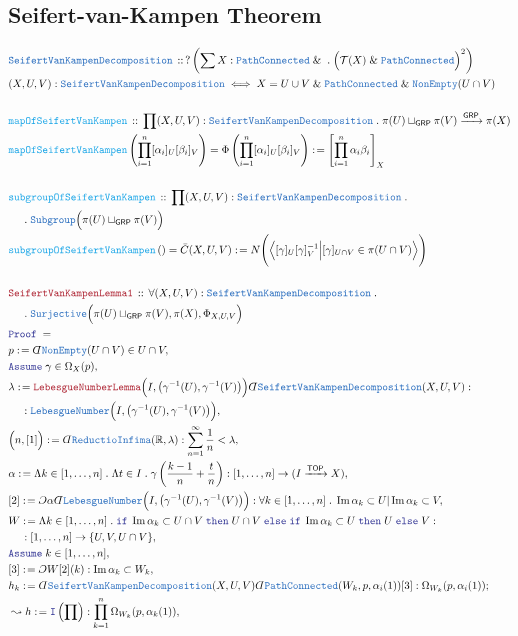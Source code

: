\documentclass[12pt]{scrartcl}
\newcommand{\TYPE}[1]{\textcolor{NavyBlue}{\mathtt{#1}}}
\newcommand{\FUNC}[1]{\textcolor{Cerulean}{\mathtt{#1}}}
\newcommand{\LOGIC}[1]{\textcolor{Blue}{\mathtt{#1}}}
\newcommand{\THM}[1]{\textcolor{Maroon}{\mathtt{#1}}}
\renewcommand{\.}{\; . \;}
\newcommand{\de}{: \kern 0.1pc =}
\newcommand{\If}{\LOGIC{if} \;}
\newcommand{\Then}{ \; \LOGIC{then} \;}
\newcommand{\Else}{\; \LOGIC{else} \;}
\newcommand{\Act}[1]{\left( #1 \right)}
\newcommand{\Theorem}[2]{& \THM{#1} \, :: \, #2 \\ & \Proof = \\ }
\newcommand{\DeclareType}[2]{& \TYPE{#1} \, :: \, #2 \\}
\newcommand{\DefineType}[3]{& #1 : \TYPE{#2} \iff #3 \\}
\newcommand{\DeclareFunc}[2]{& \FUNC{#1} \, :: \, #2 \\}
\newcommand{\DefineNamedFunc}[4]{&  \FUNC{#1}\Act{#2} = #3 \de #4 \\}
\newcommand{\NewLine}{\\ & \kern 1pc}
\newcommand{\Page}[1]{ \begin{align*} #1 \end{align*}   }
\newcommand{ \bd }{ \ByDef }
\renewcommand{\And}{\; \& \;}
\newcommand{\Intro}{\LOGIC{I}}
\newcommand{\Reals}{\mathbb{R} }
\DeclareMathOperator*{\im}{Im}
\newcommand{\Arrow}{\xrightarrow}
\newcommand{\Say}[3]{& #1 \de #2 : #3, \\}
\newcommand{\SayIn}[3]{& #1 \de #2 \in #3, \\}
\newcommand{\Conclude}[3]{& #1 \de #2 : #3; \\}
\newcommand{\Derive}[3]{& \leadsto #1 \de #2 : #3, \\}
\newcommand{\AssumeIn}[2]{& \LOGIC{Assume} \; #1 \in #2, \\}
\newcommand{\ByDef}{\rotatebox[origin=c]{-180}{$D$}}%
\newcommand{\ByConstr}{\rotatebox[origin=c]{-180}{$C$}}%
\newcommand{\Proof}{\LOGIC{Proof} \; }
\newcommand{\TOP}{\mathsf{TOP}}
\newcommand{\T}{\mathcal{T}}
\newcommand{\GRP}{\mathsf{GRP}}
\newcommand{\SVKD}{\TYPE{SeifertVanKampenDecomposition}}
\begin{document}
\subsection{Seifert-van-Kampen Theorem}
\Page{
	\DeclareType{\SVKD}
	{
		?\left(\sum X : \TYPE{PathConnected} \And  \. \Big(\T(X) \And \TYPE{PathConnected} \Big)^2 \right)
	}
	\DefineType{(X,U,V)}{\SVKD}{X = U \cup V \And \TYPE{PathConnected} \And \TYPE{NonEmpty}(U \cap V)}
	\\
	\DeclareFunc{mapOfSeifertVanKampen}
	{
		\prod (X,U,V) : \SVKD \.  \pi(U) \sqcup_{\GRP} \pi(V) \Arrow{\GRP} \pi(X) 
	}
	\DefineNamedFunc{mapOfSeifertVanKampen}{\prod^n_{i=1} [\alpha_i]_U [\beta_i]_V}
	{\Phi\left( \prod^n_{i=1} [\alpha_i]_U [\beta_i]_V \right)}
	{
		\left[ \prod^n_{i=1} \alpha_i \beta_i \right]_X
	}
	\\
	\DeclareFunc{subgroupOfSeifertVanKampen}
	{ 
		\prod (X,U,V) : \SVKD \. \NewLine \.\TYPE{Subgroup}\Big( \pi(U) \sqcup_\GRP \pi(V) \Big)
	}
	\DefineNamedFunc{subgroupOfSeifertVanKampen}{}
	{ \bar C(X,U,V)}
	{
		N\Bigg(\Big\langle  [\gamma]_U [\gamma]_V^{-1}  \Big|  [\gamma]_{U \cap V} \in \pi(U \cap V) \Big\rangle \Bigg)
	}
	\\
	\Theorem{SeifertVanKampenLemma1}{ 
		\forall (X,U,V) : \SVKD \. 
		\NewLine \.
		\TYPE{Surjective}\Big( \pi(U) \sqcup_{\GRP} \pi(V), \pi(X),\Phi_{X,U,V}\Big) 
	}
	\SayIn{p}{\bd \TYPE{NonEmpty}(U \cap V)}{U \cap V}
	\AssumeIn{\gamma}{\Omega_X(p)}
	\Say{\lambda}{\THM{LebesgueNumberLemma}\Big(I, \big(\gamma^{-1}(U),\gamma^{-1}(V) \big) \Big) \bd \SVKD(X,U,V)}
	{
		\NewLine :
		\TYPE{LebesgueNumber}\Big(I, \big(\gamma^{-1}(U),\gamma^{-1}(V) \big) \Big) 
	}
	\Say{\Big(n,[1]\Big)}{\bd \TYPE{ReductioInfima}(\Reals,\lambda)}
	{
		\sum_{n=1}^\infty \frac{1}{n} < \lambda	
	}
	\Say{\alpha}{\Lambda k \in [1,\ldots,n] \. \Lambda t \in I \. \gamma\left( \frac{k-1}{n} + \frac{t}{n}\right)}
	{
		[1,\ldots,n] \to (I \Arrow{\TOP} X)
	}
	\Say{[2]}{\ByConstr \alpha \bd \TYPE{LebesgueNumber}\Big(I, \big(\gamma^{-1}(U),\gamma^{-1}(V)\big) \Big) }
	{
		\forall k \in [1,\ldots,n] \. \im \alpha_k \subset U | \im \alpha_k \subset V
	}
	\Say{W}{\Lambda k \in [1,\ldots,n] \. 
		\If \im \alpha_k \subset U \cap V 
		\Then U \cap V 
		\Else \If \im \alpha_k \subset U 
		\Then U
		\Else V
	}{ \NewLine : [1,\ldots,n] \to \{ U,V,U \cap V \}  }
	\AssumeIn{k}{[1,\ldots,n]}
	\Say{[3]}{\ByConstr W [2](k)}{\im \alpha_k \subset W_k}
	\Conclude{h_k}{\bd \SVKD(X,U,V) \bd \TYPE{PathConnected}(W_k,p,\alpha_i(1))[3] }
	{ 
		\Omega_{W_k}(p,\alpha_i(1) )	
	}
	\Derive{h}{\Intro\Act{\prod}}{\prod^n_{k=1} \Omega_{W_k}(p,\alpha_k(1))}
}
\end{document}
